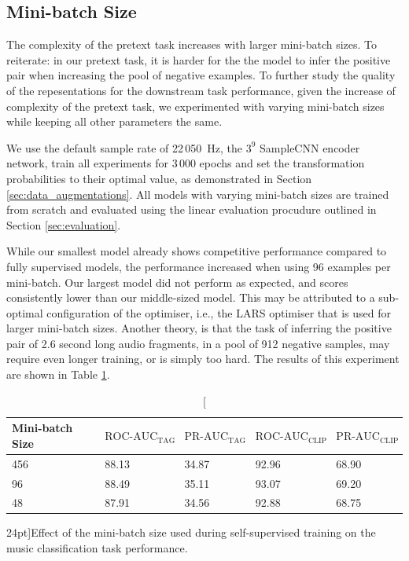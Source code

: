 \subsection{Mini-batch Size}\label{sec:exp_mini_batch_size}
The complexity of the pretext task increases with larger mini-batch sizes. To reiterate: in our pretext task, it is harder for the the model to infer the positive pair when increasing the pool of negative examples.
To further study the quality of the repesentations for the downstream task performance, given the increase of complexity of the pretext task, we experimented with varying mini-batch sizes while keeping all other parameters the same.

We use the default sample rate of 22\,050~Hz, the $3^9$ SampleCNN encoder network, train all experiments for 3\,000 epochs and set the transformation probabilities to their optimal value, as demonstrated in Section \ref{sec:data_augmentations}. All models with varying mini-batch sizes are trained from scratch and evaluated using the linear evaluation procudure outlined in Section \ref{sec:evaluation}.

While our smallest model already shows competitive performance compared to fully supervised models, the performance increased when using 96 examples per mini-batch. Our largest model did not perform as expected, and scores consistently lower than our middle-sized model. This may be attributed to a sub-optimal configuration of the optimiser, i.e., the LARS optimiser that is used for larger mini-batch sizes. Another theory, is that the task of inferring the positive pair of 2.6 second long audio fragments, in a pool of 912 negative samples, may require even longer training, or is simply too hard. The results of this experiment are shown in Table \ref{tab:mini_batch_ablation}.


\begin{table}
    \centering
    \begin{tabular}{lllll}\toprule
    Mini-batch Size & $\text{ROC-AUC}_{\text{TAG}}$ & $\text{PR-AUC}_{\text{TAG}}$ & $\text{ROC-AUC}_{\text{CLIP}}$ & $\text{PR-AUC}_{\text{CLIP}}$ \\\midrule
    456 & 88.13 & 34.87 & 92.96 & 68.90 \\
    96 & 88.49 & 35.11 & 93.07 & 69.20 \\
    48 & 87.91 & 34.56 & 92.88 & 68.75 \\\bottomrule
    \end{tabular}
    \caption[][24pt]{Effect of the mini-batch size used during self-supervised training on the music classification task performance.}
    \label{tab:mini_batch_ablation}
\end{table}


